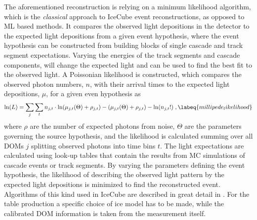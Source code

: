The aforementioned reconstruction is relying on a minimum likelihood algorithm, which is the \textit{classical} approach to IceCube event reconstructions, as opposed to ML based methods. It compares the observed light depositions in the detector to the expected light depositions from a given event hypothesis, where the event hypothesis can be constructed from building blocks of single cascade and track segment expectations. Varying the energies of the track segments and cascade components, will change the expected light and can be used to find the best fit to the observed light. A Poissonian likelihood is constructed, which compares the observed photon numbers, $n$, with their arrival times to the expected light depositions, $\mu$, for a given even hypothesis as
\begin{equation}
    \ln(L) = \sum_j \sum_t n_{j,t} \cdot \ln(\mu_{j,t}(\Theta) + \rho_{j,t}) - (\mu_{j,t}(\Theta) + \rho_{j,t}) - \ln(n_{j,t}!)
    \;,
    \labeq{millipede_likelihood}
\end{equation}
where $\rho$ are the number of expected photons from noise, $\Theta$ are the parameters governing the source hypothesis, and the likelihood is calculated summing over all DOMs $j$ splitting observed photons into time bins $t$. The light expectations are calculated using look-up tables  that contain the results from MC simulations of cascade events or track segments. By varying the parameters defining the event hypothesis, the likelihood of describing the observed light pattern by the expected light depositions is minimized to find the reconstructed event. Algorithms of this kind used in IceCube are described in great detail in . For the table production a specific choice of ice model has to be made, while the calibrated DOM information is taken from the measurement itself.


